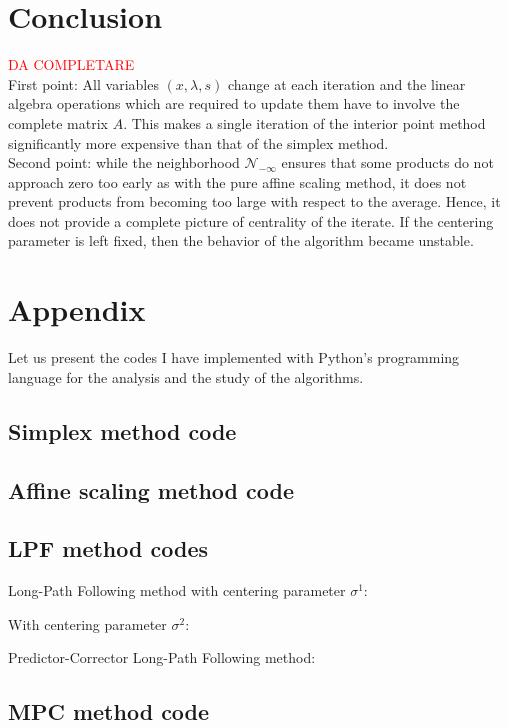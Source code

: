 \documentclass[a4paper,10 pt,titlepage,twoside]{book}
\theoremstyle{plain}
\theoremstyle{definition}
\theoremstyle{remark}
\begin{document}
\chapter{Conclusion}
\textcolor{red}{ DA COMPLETARE}\\
 First point: All variables $(x, \lambda, s)$ change at each iteration and the linear algebra operations which are required to update them have to involve the complete matrix $A$. This makes a single iteration of the interior point method significantly more expensive than that of the simplex method.\\
 Second point: while the neighborhood $\mathcal{N}_{-\infty}$ ensures that some products do not approach zero too early as with the pure affine scaling method, it does not prevent products from becoming too large with respect to the average. Hence, it does not provide a complete picture of centrality of the iterate.
If the centering parameter is left fixed, then the behavior of the
algorithm became unstable.
\appendix
\chapter*{Appendix}	
 Let us present the codes I have implemented with Python's programming language for the analysis and the study of the algorithms.
 \section*{Simplex method code}\label{app:A.1}
 
 \section*{Affine scaling method code}
 
 \section*{LPF method codes}
 Long-Path Following method with centering parameter $\sigma^{1}$:
 
With centering parameter $\sigma^{2}$:
 
Predictor-Corrector Long-Path Following method: 
 
\section*{MPC method code}

\newpage
\end{document}
